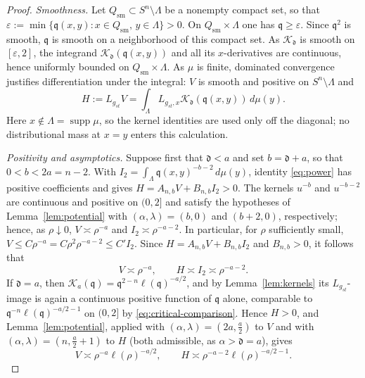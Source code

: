 \documentclass[12pt,oneside,a4paper]{article}
\theoremstyle{mytheorem}
\theoremstyle{remark}
\theoremstyle{definition}
\begin{document}
\begin{proof}
\emph{Smoothness.}  Let $Q_{\mathrm{sm}}\subset S^n\setminus\Lambda$ be a
nonempty compact set, so that
$\varepsilon:=\min\{\mathfrak q(x,y):x\in Q_{\mathrm{sm}},\,y\in\Lambda\}>0$.
On $Q_{\mathrm{sm}}\times\Lambda$ one has $\mathfrak q\ge\varepsilon$.  Since
$\mathfrak q^2$ is smooth, $\mathfrak q$ is smooth on a neighborhood of
this compact set.  As $\mathcal{K}_{\mathfrak d}$ is smooth on
$[\varepsilon,2]$, the integrand
$\mathcal{K}_{\mathfrak d}(\mathfrak q(x,y))$ and all its
$x$-derivatives are continuous, hence uniformly bounded on
$Q_{\mathrm{sm}}\times\Lambda$.  As $\mu$ is finite, dominated
convergence justifies differentiation under the integral: $V$ is
smooth and positive on $S^n\setminus\Lambda$ and
\[
 H:=L_{g_{st}}V=\int_\Lambda
 L_{g_{st},x}\mathcal{K}_{\mathfrak d}(\mathfrak q(x,y))\,d\mu(y).
\]
Here $x\notin\Lambda=\operatorname{supp}\mu$, so the kernel identities
are used only off the diagonal; no distributional mass at $x=y$ enters
this calculation.



\emph{Positivity and asymptotics.}  Suppose first that $\mathfrak d<a$ and set
$b=\mathfrak d+a$, so that $0<b<2a=n-2$.  With
\(I_2=\int_\Lambda \mathfrak q(x,y)^{-b-2}\,d\mu(y)\),
identity \eqref{eq:power} has positive coefficients and gives
\(H=A_{n,b}V+B_{n,b}I_2>0\).
The kernels $u^{-b}$ and $u^{-b-2}$ are continuous and positive on
$(0,2]$ and satisfy the hypotheses of Lemma~\ref{lem:potential} with
$(\alpha,\lambda)=(b,0)$ and $(b+2,0)$, respectively; hence, as
$\rho\downarrow0$,
\(V\asymp\rho^{-a}\)
and
\(I_2\asymp\rho^{-a-2}\).
In particular, for $\rho$ sufficiently small,
\(V\le C\rho^{-a}=C\rho^2\rho^{-a-2}\le C'I_2\).
Since $H=A_{n,b}V+B_{n,b}I_2$ and $B_{n,b}>0$, it follows that
\begin{equation}\label{eq:subcritical-asymptotics}
 V\asymp\rho^{-a},
 \qquad
 H\asymp I_2\asymp\rho^{-a-2}.
\end{equation}
If $\mathfrak d=a$, then
$\mathcal{K}_a(\mathfrak q)=\mathfrak q^{2-n}\ell(\mathfrak q)^{-a/2}$,
and by
Lemma~\ref{lem:kernels} its $L_{g_{st}}$-image is again a continuous
positive function of $\mathfrak q$ alone, comparable to
$\mathfrak q^{-n}\ell(\mathfrak q)^{-a/2-1}$ on $(0,2]$ by
\eqref{eq:critical-comparison}.  Hence $H>0$, and
Lemma~\ref{lem:potential}, applied with
$(\alpha,\lambda)=(2a,\tfrac a2)$ to $V$ and with
$(\alpha,\lambda)=(n,\tfrac a2+1)$ to $H$ (both admissible, as
$\alpha>\mathfrak d=a$), gives
\begin{equation}\label{eq:critical-asymptotics}
 V\asymp\rho^{-a}\ell(\rho)^{-a/2},
 \qquad
 H\asymp\rho^{-a-2}\ell(\rho)^{-a/2-1}.
\end{equation}


\end{proof}
\end{document}
